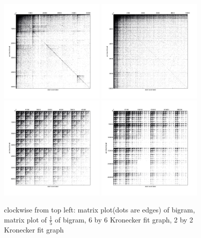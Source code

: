 \documentclass[12pt]{article}
\begin{document}
\begin{figure}
  \includegraphics[width=0.45\textwidth]{bigram_sparsematplot.png}
  \includegraphics[width=0.45\textwidth]{bigram_small_sparsematplot.png}
  \includegraphics[width=0.45\textwidth]{kronfit2_sparsematplot.png}
  \includegraphics[width=0.45\textwidth]{kronfit6_sparsematplot.png}
  \caption{clockwise from top left: matrix plot(dots are edges) of bigram, matrix plot of $\frac{1}{5}$ of bigram, 6 by 6 Kronecker fit graph, 2 by 2 Kronecker fit graph}
\end{figure}
\end{document}
